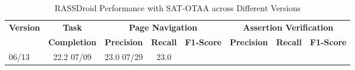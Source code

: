 
\begin{table}[htbp]
\centering
\caption{RASSDroid Performance with SAT-OTAA across Different Versions}
\label{tab:rassdroid_sat_otaa_results}
\begin{tabular}{lccccccc}
\toprule
\textbf{Version} & \textbf{Task} & \multicolumn{3}{c}{\textbf{Page Navigation}} & \multicolumn{3}{c}{\textbf{Assertion Verification}} \\
\cmidrule(lr){3-5} \cmidrule(lr){6-8}
& \textbf{Completion} & \textbf{Precision} & \textbf{Recall} & \textbf{F1-Score} & \textbf{Precision} & \textbf{Recall} & \textbf{F1-Score} \\
\midrule
06/13 & 22.2%
07/09 & 23.0%
07/29 & 23.0%
\bottomrule
\end{tabular}
\end{table}